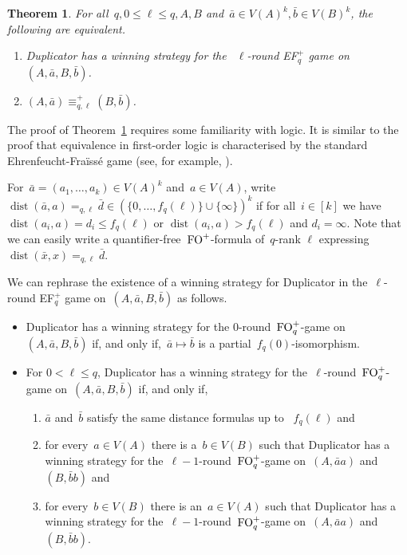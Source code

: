 \documentclass[11pt]{article}
\newtheorem{theorem}{Theorem}[section]
\numberwithin{equation}{section}
\newcommand{\FO}{\textup{FO}}
\newcommand{\dist}{\operatorname{dist}}
\newcommand{\tup}[1]{\bar{#1}}
\begin{document}
\pagebreak
\begin{theorem}\label{thm:game}
  For all~$q, 0\leq \ell\leq q, A, B$ and~$\tup{a}\in V(A)^{k}, \tup{b}\in
  V(B)^{k}$, the following are equivalent.
  \begin{enumerate}
  \item \label{item:ws}Duplicator has a winning strategy for the
   ~$\ell$-round EF$_q^+$ game on~$(A, \tup a,B,\tup
    b)$.
  \item \label{item:equiv}$(A,\tup a)\equiv^+_{q, \ell} (B,\tup b)$.
  \end{enumerate}
\end{theorem}

The proof of Theorem~\ref{thm:game} requires some familiarity with
logic. It is similar to the proof that equivalence in first-order
logic is characterised by the standard Ehrenfeucht-Fra\"iss\'e game
(see, for example, \cite{EbbinghausFluTho94}).

For~$\tup{a}=(a_1,\ldots,a_k)\in V(A)^k$ and~$a\in V(A)$, write
$\dist(\tup{a},a)=_{q,\ell}\tup{d}\in (\{0,\ldots, f_q(\ell)\}\cup\{\infty\})^k$ if for
all~$i\in[k]$ we have~$\dist(a_i, a)=d_i\leq f_q(\ell)$ or
$\dist(a_i,a)>f_q(\ell)$ and $d_i=\infty$. 
Note that we can easily
write a quantifier-free~$\FO^+$-formula of~$q$-rank
$\ell$ expressing~$\dist(\tup{x},x)=_{q,\ell}\tup{d}$.

We can rephrase the existence of a winning strategy for Duplicator
in the~$\ell$-round EF$_q^+$ game on~$(A, \tup a,B,\tup
    b)$ as follows. 
    \begin{itemize}
    \item 
Duplicator has a
winning strategy for the
$0$-round~$\FO_q^+$-game on~$(A, \tup a, B,\tup b)$ if, and
only if,~$\tup{a}\mapsto\tup{b}$ is a partial~$f_q(0)$-isomorphism. 

\item
For
$0<\ell\leq q$, Duplicator has a winning strategy  for the~$\ell$-round~$\FO_q^+$-game on~$(A, \tup a, B,\tup b)$ if, and only if,
\begin{enumerate}
\item[(1)] $\tup{a}$ and~$\tup{b}$ satisfy the same distance formulas up to
 ~$f_q(\ell)$ and
\item[(2)] for every~$a\in V(A)$ 
  there is a~$b\in V(B)$ such that
  Duplicator has a winning strategy for the~$\ell-1$-round~$\FO_q^+$-game on~$(A, \tup{a}a)$
  and~$(B,\tup{b}b)$ and
\item[(3)] for every~$b\in V(B)$ 
  there is an~$a\in V(A)$ such that
  Duplicator has a winning strategy for the~$\ell-1$-round~$\FO_q^+$-game on~$(A, \tup{a}a)$
  and~$(B,\tup{b}b)$.
\end{enumerate}
    \end{itemize}
\end{document}

